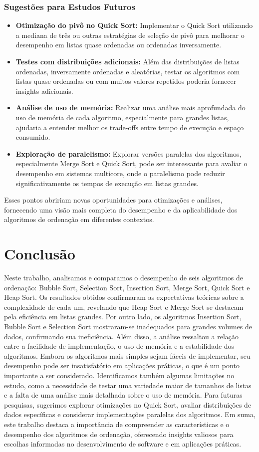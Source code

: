 \documentclass[12pt, a4paper]{report}
\begin{document}
\subsection{Sugestões para Estudos Futuros}
\begin{itemize}
    \item \textbf{Otimização do pivô no Quick Sort:} Implementar o Quick Sort utilizando a mediana de três ou outras estratégias de seleção de pivô para melhorar o desempenho em listas quase ordenadas ou ordenadas inversamente.
    \item \textbf{Testes com distribuições adicionais:} Além das distribuições de listas ordenadas, inversamente ordenadas e aleatórias, testar os algoritmos com listas quase ordenadas ou com muitos valores repetidos poderia fornecer insights adicionais.
    \item \textbf{Análise de uso de memória:} Realizar uma análise mais aprofundada do uso de memória de cada algoritmo, especialmente para grandes listas, ajudaria a entender melhor os trade-offs entre tempo de execução e espaço consumido.
    \item \textbf{Exploração de paralelismo:} Explorar versões paralelas dos algoritmos, especialmente Merge Sort e Quick Sort, pode ser interessante para avaliar o desempenho em sistemas multicore, onde o paralelismo pode reduzir significativamente os tempos de execução em listas grandes.
\end{itemize}

Esses pontos abririam novas oportunidades para otimizações e análises, fornecendo uma visão mais completa do desempenho e da aplicabilidade dos algoritmos de ordenação em diferentes contextos.


\chapter{Conclusão}
Neste trabalho, analisamos e comparamos o desempenho de seis algoritmos de ordenação: Bubble Sort, Selection Sort, Insertion Sort, Merge Sort, Quick Sort e Heap Sort. Os resultados obtidos confirmaram as expectativas teóricas sobre a complexidade de cada um, revelando que Heap Sort e Merge Sort se destacam pela eficiência em listas grandes. Por outro lado, os algoritmos Insertion Sort, Bubble Sort e Selection Sort mostraram-se inadequados para grandes volumes de dados, confirmando sua ineficiência.
Além disso, a análise ressaltou a relação entre a facilidade de implementação, o uso de memória e a estabilidade dos algoritmos. Embora os algoritmos mais simples sejam fáceis de implementar, seu desempenho pode ser insatisfatório em aplicações práticas, o que é um ponto importante a ser considerado.
Identificamos também algumas limitações no estudo, como a necessidade de testar uma variedade maior de tamanhos de listas e a falta de uma análise mais detalhada sobre o uso de memória. Para futuras pesquisas, sugerimos explorar otimizações no Quick Sort, avaliar distribuições de dados específicas e considerar implementações paralelas dos algoritmos.
Em suma, este trabalho destaca a importância de compreender as características e o desempenho dos algoritmos de ordenação, oferecendo insights valiosos para escolhas informadas no desenvolvimento de software e em aplicações práticas.
\end{document}
